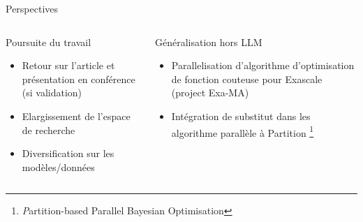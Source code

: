 
\begin{frame}{Perspectives}
    \begin{columns}
        
        \begin{column}[t]{0.45\textwidth} 
            \begin{block}{Poursuite du travail}
                \begin{itemize}
                    \item Retour sur l'article et présentation en conférence (si validation)
                    \item Elargissement de l'espace de recherche
                    \item Diversification sur les modèles/données
                \end{itemize}                
            \end{block}

        \end{column}  
            \begin{column}[t]{0.45\textwidth}
                \begin{block}{Généralisation hors LLM}
                    \begin{itemize}
                        \item Parallelisation d'algorithme d'optimisation de fonction couteuse pour Exascale (project Exa-MA)
                        \item Intégration de substitut dans les algorithme parallèle à Partition \footnote[3]{\textit Partition-based Parallel Bayesian Optimisation}
                    \end{itemize}                
                \end{block}
            \end{column}
        
                 
    \end{columns}
    
\end{frame}